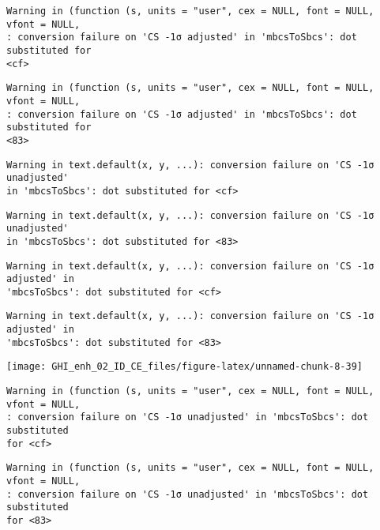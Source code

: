 \documentclass[
  10pt,
  a4paper,oneside]{article}
\begin{document}
\begin{verbatim}
Warning in (function (s, units = "user", cex = NULL, font = NULL, vfont = NULL,
: conversion failure on 'CS -1σ adjusted' in 'mbcsToSbcs': dot substituted for
<cf>
\end{verbatim}

\begin{verbatim}
Warning in (function (s, units = "user", cex = NULL, font = NULL, vfont = NULL,
: conversion failure on 'CS -1σ adjusted' in 'mbcsToSbcs': dot substituted for
<83>
\end{verbatim}

\begin{verbatim}
Warning in text.default(x, y, ...): conversion failure on 'CS -1σ unadjusted'
in 'mbcsToSbcs': dot substituted for <cf>
\end{verbatim}

\begin{verbatim}
Warning in text.default(x, y, ...): conversion failure on 'CS -1σ unadjusted'
in 'mbcsToSbcs': dot substituted for <83>
\end{verbatim}

\begin{verbatim}
Warning in text.default(x, y, ...): conversion failure on 'CS -1σ adjusted' in
'mbcsToSbcs': dot substituted for <cf>
\end{verbatim}

\begin{verbatim}
Warning in text.default(x, y, ...): conversion failure on 'CS -1σ adjusted' in
'mbcsToSbcs': dot substituted for <83>
\end{verbatim}

\begin{center}\texttt{[image: GHI\_enh\_02\_ID\_CE\_files/figure-latex/unnamed-chunk-8-39]} \end{center}

\begin{verbatim}
Warning in (function (s, units = "user", cex = NULL, font = NULL, vfont = NULL,
: conversion failure on 'CS -1σ unadjusted' in 'mbcsToSbcs': dot substituted
for <cf>
\end{verbatim}

\begin{verbatim}
Warning in (function (s, units = "user", cex = NULL, font = NULL, vfont = NULL,
: conversion failure on 'CS -1σ unadjusted' in 'mbcsToSbcs': dot substituted
for <83>
\end{verbatim}
\end{document}

